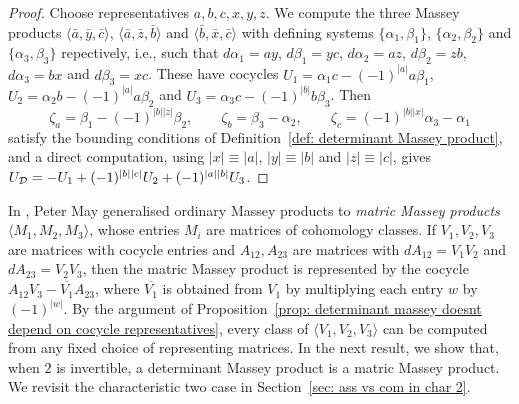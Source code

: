 \documentclass[11pt]{article}
\theoremstyle{definition}
\theoremstyle{definition}
\begin{document}
\begin{proof} 
Choose representatives $a,b,c,x,y,z$. We compute the three Massey products $\langle \bar a,\bar y,\bar c\rangle$, 
$\langle \bar a,\bar z,\bar b\rangle$ and $\langle \bar b,\bar x,\bar c\rangle$  with defining systems $\{\alpha_1,\beta_1\}$, $\{\alpha_2,\beta_2\}$ and $\{\alpha_3,\beta_3\}$ repectively, i.e., such that $d\alpha_1=ay$, $d\beta_1=yc$, $d\alpha_2=az$, $d\beta_2=zb$, $d\alpha_3=bx$ and $d\beta_3=xc$. 
These have cocycles $U_1=\alpha_1c-(-1)^{|a|}a\beta_1$, $U_2=\alpha_2b-(-1)^{|a|}a\beta_2$ and $U_3=\alpha_3c-(-1)^{|b|}b\beta_3$. 
Then
\begin{equation*}
\zeta_a = \beta_1 - (-1)^{|b||z|}\beta_2, \qquad \zeta_b = \beta_3 - \alpha_2, \qquad \zeta_c = (-1)^{|b||x|} \alpha_3 - \alpha_1 
\end{equation*} 
satisfy the bounding conditions of Definition~\ref{def: determinant Massey product},
and a direct computation, using $|x|\equiv|a|$, $|y|\equiv|b|$ and $|z|\equiv|c|$, 
gives $U_{\mathcal D}=-U_1+(-1)^{|b||c|}U_2+(-1)^{|a||b|}U_3$.
\end{proof}



In \cite{May69}, Peter May generalised ordinary Massey products to \emph{matric 
Massey products} $\langle M_1,M_2,M_3\rangle$, 
whose entries $M_i$ are matrices of cohomology classes.
If $V_1,V_2,V_3$ are matrices with cocycle entries and $A_{12},A_{23}$ are matrices with $dA_{12}=V_1V_2$ and
$dA_{23}=V_2V_3$, then the matric Massey product is represented by the cocycle $A_{12}V_3-\overline{V_1}A_{23}$, 
where $\overline{V_1}$ is obtained from $V_1$ by multiplying each entry $w$ by $(-1)^{|w|}$. 
By the argument of Proposition~\ref{prop: determinant massey doesnt depend on cocycle representatives},
every class of $\langle V_1,V_2,V_3\rangle$ can be computed from any fixed choice of representing matrices.
In the next result, we show that, when $2$ is invertible, a determinant Massey product 
is a matric Massey product.
We revisit the characteristic two case in Section~\ref{sec: ass vs com in char 2}. 
\end{document}
